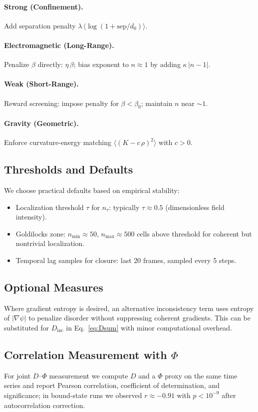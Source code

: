 \documentclass[12pt]{article}
\begin{document}
\paragraph{Strong (Confinement).} Add separation penalty $\lambda\,\langle \log(1+\mathrm{sep}/d_0)\rangle$.
\paragraph{Electromagnetic (Long-Range).} Penalize $\beta$ directly: $\eta\,\beta$; bias exponent to $n\approx 1$ by adding $\kappa\,|n-1|$.
\paragraph{Weak (Short-Range).} Reward screening: impose penalty for $\beta<\beta_0$; maintain $n$ near $\sim 1$.
\paragraph{Gravity (Geometric).} Enforce curvature-energy matching $\langle (K-c\,\rho)^2\rangle$ with $c>0$.

\subsection{Thresholds and Defaults}
We choose practical defaults based on empirical stability:
\begin{itemize}[leftmargin=1.2em]
  \item Localization threshold $\tau$ for $n_{\tau}$: typically $\tau\approx 0.5$ (dimensionless field intensity).
  \item Goldilocks zone: $n_{\min}\approx 50$, $n_{\max}\approx 500$ cells above threshold for coherent but nontrivial localization.
  \item Temporal lag samples for closure: last 20 frames, sampled every 5 steps.
\end{itemize}
\subsection{Optional Measures}
Where gradient entropy is desired, an alternative inconsistency term uses entropy of $|\nabla\psi|$ to penalize disorder without suppressing coherent gradients. This can be substituted for $D_{\mathrm{inc}}$ in Eq.~\eqref{eq:Dsum} with minor computational overhead.

\subsection{Correlation Measurement with $\Phi$}
For joint $D$--$\Phi$ measurement we compute $D$ and a $\Phi$ proxy on the same time series and report Pearson correlation, coefficient of determination, and significance; in bound-state runs we observed $r\approx-0.91$ with $p<10^{-9}$ after autocorrelation correction.
\end{document}
